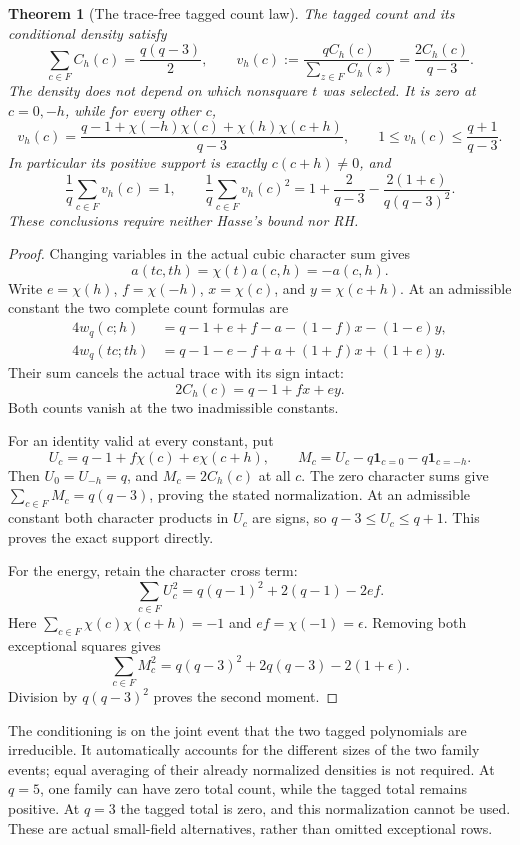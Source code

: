 \documentclass[11pt]{article}
\newtheorem{theorem}{Theorem}[section]
\begin{document}
\begin{theorem}[The trace-free tagged count law]\label{thm:positiveTwistLaw}
The tagged count and its conditional density satisfy
\[
 \sum_{c\in F}C_h(c)=\frac{q(q-3)}2,\qquad
 v_h(c):=\frac{qC_h(c)}{\sum_{z\in F}C_h(z)}=\frac{2C_h(c)}{q-3}.
\]
The density does not depend on which nonsquare \(t\) was selected.
It is zero at \(c=0,-h\), while for every other \(c\),
\[
 v_h(c)=\frac{q-1+\chi(-h)\chi(c)+\chi(h)\chi(c+h)}{q-3},
 \qquad
 1\leq v_h(c)\leq\frac{q+1}{q-3}.
\]
In particular its positive support is exactly \(c(c+h)\ne0\), and
\[
 \frac1q\sum_{c\in F}v_h(c)=1,\qquad
 \frac1q\sum_{c\in F}v_h(c)^2
 =1+\frac{2}{q-3}-\frac{2(1+\epsilon)}{q(q-3)^2}.
\]
These conclusions require neither Hasse's bound nor RH.
\end{theorem}

\begin{proof}
Changing variables in the actual cubic character sum gives
\[
 a(tc,th)=\chi(t)a(c,h)=-a(c,h).
\]
Write \(e=\chi(h)\), \(f=\chi(-h)\), \(x=\chi(c)\), and
\(y=\chi(c+h)\). At an admissible constant the two complete count
formulas are
\[
\begin{split}
 4w_q(c;h)&=q-1+e+f-a-(1-f)x-(1-e)y,\\
 4w_q(tc;th)&=q-1-e-f+a+(1+f)x+(1+e)y.
\end{split}
\]
Their sum cancels the actual trace with its sign intact:
\[
                   2C_h(c)=q-1+fx+ey.
\]
Both counts vanish at the two inadmissible constants.

For an identity valid at every constant, put
\[
 U_c=q-1+f\chi(c)+e\chi(c+h),\qquad
 M_c=U_c-q\mathbf1_{c=0}-q\mathbf1_{c=-h}.
\]
Then \(U_0=U_{-h}=q\), and \(M_c=2C_h(c)\) at all \(c\).
The zero character sums give
\(\sum_{c\in F}M_c=q(q-3)\), proving the stated normalization. At an
admissible constant both character products in \(U_c\) are signs,
so \(q-3\leq U_c\leq q+1\). This proves the exact support directly.

For the energy, retain the character cross term:
\[
 \sum_{c\in F}U_c^2=q(q-1)^2+2(q-1)-2ef.
\]
Here \(\sum_{c\in F}\chi(c)\chi(c+h)=-1\) and \(ef=\chi(-1)=\epsilon\).
Removing both exceptional squares gives
\[
 \sum_{c\in F}M_c^2
   =q(q-3)^2+2q(q-3)-2(1+\epsilon).
\]
Division by \(q(q-3)^2\) proves the second moment.
\end{proof}

The conditioning is on the joint event that the two tagged polynomials
are irreducible. It automatically accounts for the different sizes of
the two family events; equal averaging of their already normalized
densities is not required. At \(q=5\), one family can have zero total
count, while the tagged total remains positive. At \(q=3\) the tagged
total is zero, and this normalization cannot be used. These are actual
small-field alternatives, rather than omitted exceptional rows.
\end{document}
